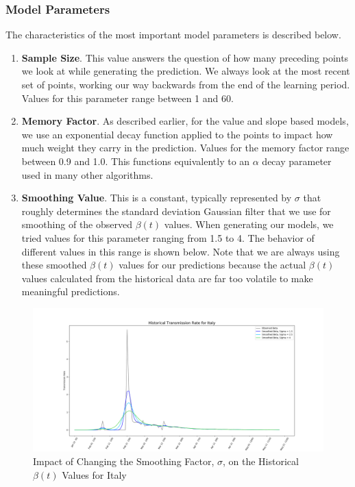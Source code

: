 \documentclass[11pt]{article}
\begin{document}
\subsubsection{Model Parameters}
The characteristics of the most important model parameters is described below.
\begin{enumerate}
    \item \textbf{Sample Size}. This value answers the question of how many preceding points we look at while generating the prediction. We always look at the most recent set of points, working our way backwards from the end of the learning period. Values for this parameter range between 1 and 60.
    \item \textbf{Memory Factor}. As described earlier, for the value and slope based models, we use an exponential decay function applied to the points to impact how much weight they carry in the prediction. Values for the memory factor range between 0.9 and 1.0. This functions equivalently to an $\alpha$ decay parameter used in many other algorithms.
    \item \textbf{Smoothing Value}. This is a constant, typically represented by $\sigma$ that roughly determines the standard deviation Gaussian filter that we use for smoothing of the observed $\beta(t)$ values. When generating our models, we tried values for this parameter ranging from 1.5 to 4. The behavior of different values in this range is shown below. Note that we are always using these smoothed $\beta(t)$ values for our predictions because the actual $\beta(t)$ values calculated from the historical data are far too volatile to make meaningful predictions.
\end{enumerate}

\begin{figure}[h]
    \includegraphics[width=16cm]{images/ItalyTransmission.png}
    \centering
    \caption{Impact of Changing the Smoothing Factor, $\sigma$, on the Historical $\beta(t)$ Values for Italy}
    \label{fig:italy-transmission}
\end{figure}
\end{document}
